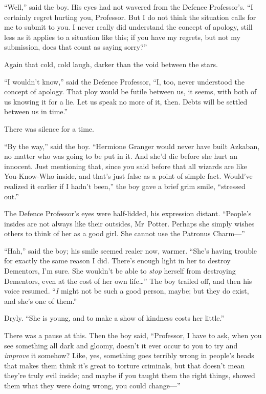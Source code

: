 “Well,” said the boy. His eyes had not wavered from the Defence Professor’s. “I certainly regret hurting you, Professor. But I do not think the situation calls for me to submit to you. I never really did understand the concept of apology, still less as it applies to a situation like this; if you have my regrets, but not my submission, does that count as saying sorry?”

Again that cold, cold laugh, darker than the void between the stars.

“I wouldn’t know,” said the Defence Professor, “I, too, never understood the concept of apology. That ploy would be futile between us, it seems, with both of us knowing it for a lie. Let us speak no more of it, then. Debts will be settled between us in time.”

There was silence for a time.

“By the way,” said the boy. “Hermione Granger would never have built Azkaban, no matter who was going to be put in it. And she’d die before she hurt an innocent. Just mentioning that, since you said before that all wizards are like You-Know-Who inside, and that’s just false as a point of simple fact. Would’ve realized it earlier if I hadn’t been,” the boy gave a brief grim smile, “stressed out.”

The Defence Professor’s eyes were half-lidded, his expression distant. “People’s insides are not always like their outsides, Mr~Potter. Perhaps she simply wishes others to think of her as a good girl. She cannot use the Patronus Charm—”

“Hah,” said the boy; his smile seemed realer now, warmer. “She’s having trouble for exactly the same reason I did. There’s enough light in her to destroy Dementors, I’m sure. She wouldn’t be able to \emph{stop} herself from destroying Dementors, even at the cost of her own life…” The boy trailed off, and then his voice resumed. “\emph{I} might not be such a good person, maybe; but they do exist, and she’s one of them.”

Dryly. “She is young, and to make a show of kindness costs her little.”

There was a pause at this. Then the boy said, “Professor, I have to ask, when you see something all dark and gloomy, doesn’t it ever occur to you to try and \emph{improve} it somehow? Like, yes, something goes terribly wrong in people’s heads that makes them think it’s great to torture criminals, but that doesn’t mean they’re truly evil inside; and maybe if you taught them the right things, showed them what they were doing wrong, you could change—”


